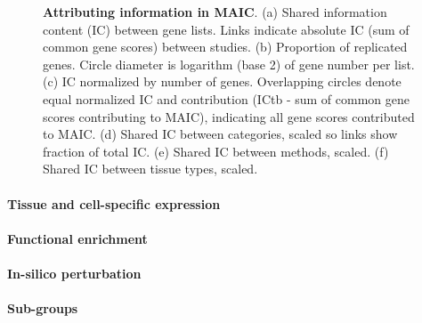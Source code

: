 \documentclass[
  11,
  a4paper,
]{article}
\let\oldparagraph\paragraph
\renewcommand{\paragraph}[1]{\oldparagraph{#1}\mbox{}}
\begin{document}
\begin{figure}
{}

\caption{\label{fig-fig2}\textbf{Attributing information in MAIC}. (a)
Shared information content (IC) between gene lists. Links indicate
absolute IC (sum of common gene scores) between studies. (b) Proportion
of replicated genes. Circle diameter is logarithm (base 2) of gene
number per list. (c) IC normalized by number of genes. Overlapping
circles denote equal normalized IC and contribution (ICtb - sum of
common gene scores contributing to MAIC), indicating all gene scores
contributed to MAIC. (d) Shared IC between categories, scaled so links
show fraction of total IC. (e) Shared IC between methods, scaled. (f)
Shared IC between tissue types, scaled.}

\end{figure}

\hypertarget{tissue-and-cell-specific-expression}{%
\paragraph{Tissue and cell-specific
expression}\label{tissue-and-cell-specific-expression}}

\hypertarget{functional-enrichment}{%
\paragraph{Functional enrichment}\label{functional-enrichment}}

\hypertarget{in-silico-perturbation}{%
\paragraph{In-silico perturbation}\label{in-silico-perturbation}}

\hypertarget{sub-groups}{%
\paragraph{Sub-groups}\label{sub-groups}}
\end{document}
